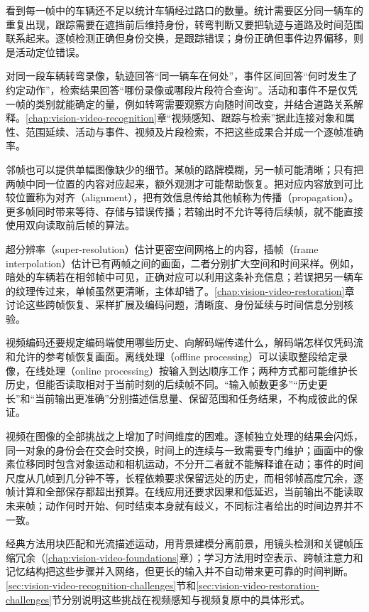看到每一帧中的车辆还不足以统计车辆经过路口的数量。统计需要区分同一辆车的重复出现，跟踪需要在遮挡前后维持身份，转弯判断又要把轨迹与道路及时间范围联系起来。逐帧检测正确但身份交换，是跟踪错误；身份正确但事件边界偏移，则是活动定位错误。

对同一段车辆转弯录像，轨迹回答“同一辆车在何处”，事件区间回答“何时发生了约定动作”，检索结果回答“哪份录像或哪段片段符合查询”。活动和事件不是仅凭一帧的类别就能确定的量，例如转弯需要观察方向随时间改变，并结合道路关系解释。\ref{chap:vision-video-recognition}章“视频感知、跟踪与检索”据此连接对象和属性、范围延续、活动与事件、视频及片段检索，不把这些成果合并成一个逐帧准确率。

邻帧也可以提供单幅图像缺少的细节。某帧的路牌模糊，另一帧可能清晰；只有把两帧中同一位置的内容对应起来，额外观测才可能帮助恢复。把对应内容放到可比较位置称为对齐（alignment），把有效信息传给其他帧称为传播（propagation）。更多帧同时带来等待、存储与错误传播；若输出时不允许等待后续帧，就不能直接使用双向读取前后帧的算法。

超分辨率（super-resolution）估计更密空间网格上的内容，插帧（frame interpolation）估计已有两帧之间的画面，二者分别扩大空间和时间采样。例如，暗处的车辆若在相邻帧中可见，正确对应可以利用这条补充信息；若误把另一辆车的纹理传过来，单帧虽然更清晰，主体却错了。\ref{chap:vision-video-restoration}章讨论这些跨帧恢复、采样扩展及编码问题，清晰度、身份延续与时间信息分别核验。

视频编码还要规定编码端使用哪些历史、向解码端传递什么，解码端怎样仅凭码流和允许的参考帧恢复画面。离线处理（offline processing）可以读取整段给定录像，在线处理（online processing）按输入到达顺序工作；两种方式都可能维护长历史，但能否读取相对于当前时刻的后续帧不同。“输入帧数更多”“历史更长”和“当前输出更准确”分别描述信息量、保留范围和任务结果，不构成彼此的保证。

视频在图像的全部挑战之上增加了时间维度的困难。逐帧独立处理的结果会闪烁，同一对象的身份会在交会时交换，时间上的连续与一致需要专门维护；画面中的像素位移同时包含对象运动和相机运动，不分开二者就不能解释谁在动；事件的时间尺度从几帧到几分钟不等，长程依赖要求保留远处的历史，而相邻帧高度冗余，逐帧计算和全部保存都超出预算。在线应用还要求因果和低延迟，当前输出不能读取未来帧；动作何时开始、何时结束本身就有歧义，不同标注者给出的时间边界并不一致。

经典方法用块匹配和光流描述运动，用背景建模分离前景，用镜头检测和关键帧压缩冗余（\ref{chap:vision-video-foundations}章）；学习方法用时空表示、跨帧注意力和记忆结构把这些步骤并入网络，但更长的输入并不自动带来更可靠的时间判断。\ref{sec:vision-video-recognition-challenges}节和\ref{sec:vision-video-restoration-challenges}节分别说明这些挑战在视频感知与视频复原中的具体形式。


